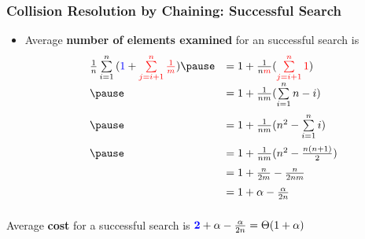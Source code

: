 \documentclass[UTF8,11pt]{beamer}
\begin{document}
\begin{frame}
\frametitle{Collision Resolution by Chaining: Successful Search}
\begin{block}{}
	\begin{center}	
		\begin{itemize}
			\item  Average \textbf{\color{blue}number of elements examined} for an successful search is \[
			\begin{array}{ll}
			\frac{1}{n}\sum\limits_{i=1}^{n}{(\textcolor{blue}{1}+\textcolor{red}{\sum\limits_{j=i+1}^{n}{\frac{1}{m}}})}
			\pause&=1+\frac{1}{n\textcolor{red}{m}}{(\textcolor{red}{\sum\limits_{j=i+1}^{n}{1}})}\\\vspace{0.2cm}
			\pause&={1}+\frac{1}{nm}{({\sum\limits_{i=1}^{n}{n-i}})}\\\vspace{0.2cm}
			\pause&={1}+\frac{1}{nm}{(n^2-{\sum\limits_{i=1}^{n}{i}})}\\\vspace{0.2cm}
			\pause&={1}+\frac{1}{nm}{(n^2-\frac{n(n+1)}{2})}\\\vspace{0.2cm}
			&={1}+\frac{n}{2m}-\frac{n}{2nm}\\\vspace{0.2cm}
			&={1}+\alpha-\frac{\alpha}{2n}
			\end{array}\]
		\end{itemize}
		\pause
		\item  Average \textbf{\color{blue}cost} for a successful search is ${\textcolor{blue}{\textbf{2}}}+\alpha-\frac{\alpha}{2n}=\Theta(1+\alpha)$
	\end{center}
\end{block}
\end{frame}
\end{document}
